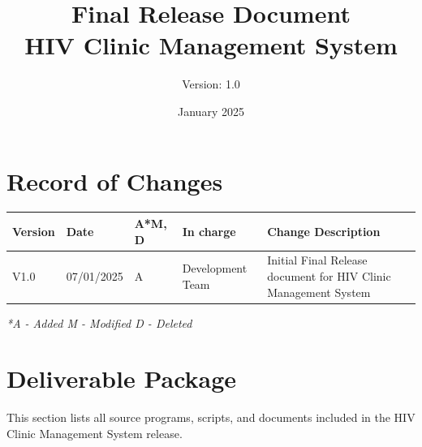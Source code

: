 \documentclass[12pt,a4paper]{article}
\title{\textbf{Final Release Document\\HIV Clinic Management System}}
\author{Version: 1.0}
\date{January 2025}
\begin{document}
\maketitle
\thispagestyle{empty}

\newpage

\section*{Record of Changes}

\begin{longtable}{|p{2cm}|p{2cm}|p{1cm}|p{3cm}|p{6cm}|}
\hline
\textbf{Version} & \textbf{Date} & \textbf{A*M, D} & \textbf{In charge} & \textbf{Change Description} \\
\hline
V1.0 & 07/01/2025 & A & Development Team & Initial Final Release document for HIV Clinic Management System \\
\hline
\end{longtable}

\textit{*A - Added M - Modified D - Deleted}

\newpage

\tableofcontents

\newpage

\section{Deliverable Package}

This section lists all source programs, scripts, and documents included in the HIV Clinic Management System release.
\end{document}
